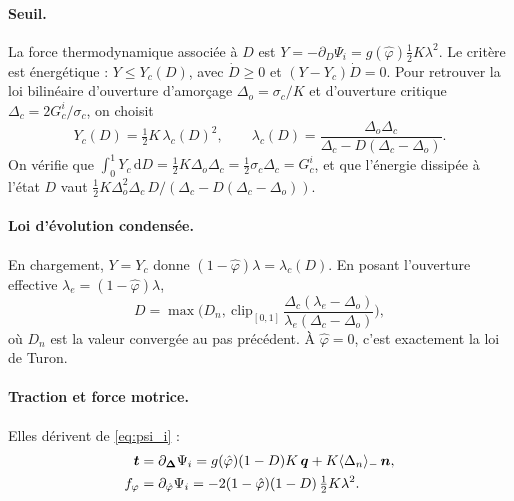 \documentclass[11pt,a4paper]{article}
\newcommand{\jump}{\bm{\Delta}}\newcommand{\Do}{\Delta_o}\newcommand{\Dc}{\Delta_c}
\newcommand{\phib}{\hat\varphi}
\newcommand{\dd}{\,\mathrm{d}}
\begin{document}
\paragraph{Seuil.} La force thermodynamique associée à $D$ est $Y=-\partial_D\Psi_i = g(\phib)\tfrac12K\lambda^2$.
Le critère est énergétique : $Y\le Y_c(D)$, avec $\dot D\ge 0$ et $(Y-Y_c)\dot D=0$. Pour retrouver la loi
bilinéaire d'ouverture d'amorçage $\Do=\sigma_c/K$ et d'ouverture critique $\Dc=2G_c^i/\sigma_c$, on choisit
\begin{equation}
Y_c(D)=\tfrac12 K\,\lambda_c(D)^2,\qquad \lambda_c(D)=\frac{\Do\Dc}{\Dc-D(\Dc-\Do)} .
\end{equation}
On vérifie que $\int_0^1Y_c\dd D=\tfrac12K\Do\Dc=\tfrac12\sigma_c\Dc=G_c^i$, et que l'énergie dissipée à
l'état $D$ vaut $\tfrac12K\Do^2\Dc\,D/(\Dc-D(\Dc-\Do))$.

\paragraph{Loi d'évolution condensée.} En chargement, $Y=Y_c$ donne $(1-\phib)\lambda=\lambda_c(D)$.
En posant l'ouverture effective $\lambda_e=(1-\phib)\lambda$,
\begin{equation}
D=\max\!\Big(D_n,\ \mathrm{clip}_{[0,1]}\,\frac{\Dc(\lambda_e-\Do)}{\lambda_e(\Dc-\Do)}\Big),
\label{eq:D}
\end{equation}
où $D_n$ est la valeur convergée au pas précédent. À $\phib=0$, c'est exactement la loi de Turon.

\paragraph{Traction et force motrice.} Elles dérivent de \eqref{eq:psi_i} :
\begin{align}
\bt &= \partial_{\jump}\Psi_i = g(\phib)(1-D)K\,\bq + K\nega{\Delta_n}\,\bm{n}, \label{eq:t}\\
f_\varphi &= \partial_{\phib}\Psi_i = -2(1-\phib)(1-D)\,\tfrac12K\lambda^2 . \label{eq:fphi}
\end{align}
\end{document}
